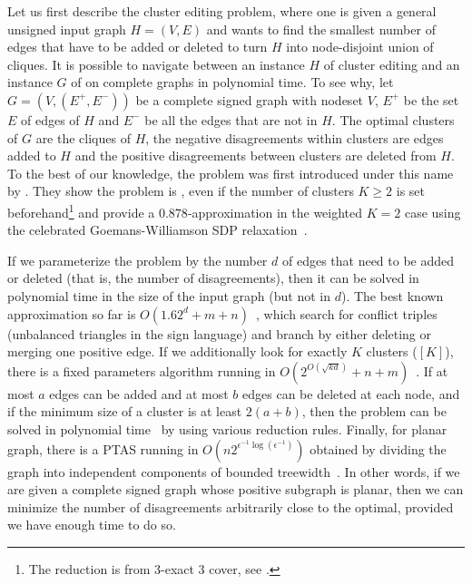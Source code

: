 Let us first describe the cluster editing problem, where one is given a general unsigned input graph
$H=(V,E)$ and wants to
find the smallest number of edges that have to be added or deleted to turn $H$ into node-disjoint
union of cliques. It is possible to navigate between an instance $H$ of cluster editing and an
instance $G$ of \pcc{} on complete graphs in polynomial time. To see why, let $G=(V,(E^+,E^-))$
be a complete signed graph with nodeset $V$, $E^+$ be the set $E$ of edges of $H$ and $E^-$ be all
the edges that are not in $H$. The optimal clusters of $G$ are the cliques of $H$, the negative
disagreements within clusters are edges added to $H$ and the positive disagreements between clusters
are deleted from $H$. To the best of our knowledge, the problem was first introduced under this
name by \textcite{Shamir02}. They show the problem is
\NPc{}, even if the number of clusters $K\geq2$ is set beforehand\footnote{The reduction is from
3-exact 3 cover, see \autocite[Theorems 1, 2 and Corollary 1]{Shamir02}.} and provide a
$0.878$-approximation in the weighted $K=2$ case using the celebrated Goemans-Williamson SDP
relaxation~\autocite{MaxCutSDP95}.

If we parameterize the problem by the number $d$ of edges that need to be added or deleted (that is,
the number of disagreements), then it can be solved in polynomial time in the size of the input
graph (but not in $d$). The best known approximation so far is
$O(1.62^d+m+n)$~\autocite{GoldenCE12}, which search for conflict triples (\ie unbalanced triangles
in the sign language) and branch by either deleting or merging one positive edge. If we additionally
look for exactly $K$ clusters (\ie \mind$[K]$), there is a fixed parameters algorithm running in
$O(2^{O(\sqrt{kd})}+n+m)$~\autocite{Fomin2014}. If at most $a$ edges can be added and at most $b$
edges can be deleted at each node, and if the minimum size of a cluster is at least $2(a+b)$, then
the problem can be solved in polynomial time~\autocite{Abu-Khzam2015} by using various reduction
rules. Finally, for planar graph, there is a PTAS%
running in $O(n2^{\epsilon^{-1}\log(\epsilon^{-1})})$ obtained by dividing the graph
into independent components of bounded treewidth~\autocite{PlanarCEPTAS17}. In other words, if we
are given a complete signed graph whose positive subgraph is planar, then we can minimize the number
of disagreements arbitrarily close to the optimal, provided we have enough time to do so.

